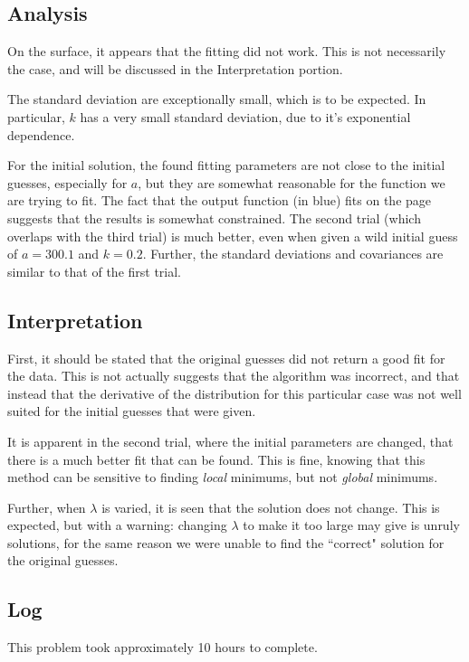 \documentclass[10pt,letter]{article}
\begin{document}
\subsection{Analysis}

On the surface, it appears that the fitting did not work. This is not necessarily the case, and will be discussed in the Interpretation portion.

The standard deviation are exceptionally small, which is to be expected. In particular, $k$ has a very small standard deviation, due to it's exponential dependence.

For the initial solution, the found fitting parameters are not close to the initial guesses, especially for $a$, but they are somewhat reasonable for the function we are trying to fit.  The fact that the output function (in blue) fits on the page suggests that the results is somewhat constrained. The second trial (which overlaps with the third trial) is much better, even when given a wild initial guess of $a=300.1$ and $k=0.2$. Further, the standard deviations and covariances are similar to that of the first trial.

\subsection{Interpretation}

First, it should be stated that the original guesses did not return a good fit for the data. This is not actually suggests that the algorithm was incorrect, and that instead that the derivative of the distribution for this particular case was not well suited for the initial guesses that were given.

It is apparent in the second trial, where the initial parameters are changed, that there is a much better fit that can be found. This is fine, knowing that this method can be sensitive to finding \emph{local} minimums, but not \emph{global} minimums.

Further, when $\lambda$ is varied, it is seen that the solution does not change. This is expected, but with a warning: changing $\lambda$ to make it too large may give is unruly solutions, for the same reason we were unable to find the ``correct" solution for the original guesses.
\subsection{Log}

This problem took approximately 10 hours to complete.
\end{document}
